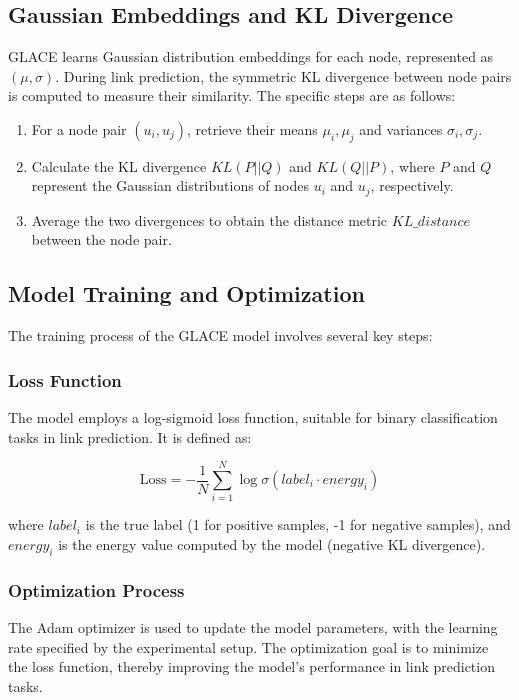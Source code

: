 \documentclass[11pt]{article}
\begin{document}
\subsection{Gaussian Embeddings and KL Divergence}

GLACE learns Gaussian distribution embeddings for each node, represented as $(\mu, \sigma)$. During link prediction, the symmetric KL divergence between node pairs is computed to measure their similarity. The specific steps are as follows:

\begin{enumerate}
    \item For a node pair $(u_i, u_j)$, retrieve their means $\mu_i, \mu_j$ and variances $\sigma_i, \sigma_j$.
    \item Calculate the KL divergence $KL(P||Q)$ and $KL(Q||P)$, where $P$ and $Q$ represent the Gaussian distributions of nodes $u_i$ and $u_j$, respectively.
    \item Average the two divergences to obtain the distance metric $KL\_distance$ between the node pair.
\end{enumerate}

\subsection{Model Training and Optimization}

The training process of the GLACE model involves several key steps:

\subsubsection{Loss Function}

The model employs a log-sigmoid loss function, suitable for binary classification tasks in link prediction. It is defined as:

\[
\text{Loss} = -\frac{1}{N} \sum_{i=1}^{N} \log \sigma(label_i \cdot energy_i)
\]

where $label_i$ is the true label (1 for positive samples, -1 for negative samples), and $energy_i$ is the energy value computed by the model (negative KL divergence).

\subsubsection{Optimization Process}

The Adam optimizer is used to update the model parameters, with the learning rate specified by the experimental setup. The optimization goal is to minimize the loss function, thereby improving the model's performance in link prediction tasks.
\end{document}
